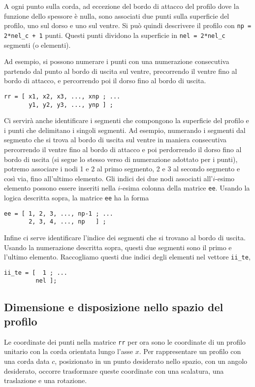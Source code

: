 \documentclass[11pt,fleqn]{article}
\begin{document}
A ogni punto sulla corda, ad eccezione del bordo di attacco del profilo dove la funzione dello spessore è nulla, sono associati due punti sulla superficie del profilo, uno sul dorso e uno sul ventre. Si può quindi descrivere il profilo con \texttt{np = 2*nel\_c + 1} punti. Questi punti dividono la superficie in \texttt{nel = 2*nel\_c} segmenti (o elementi).

Ad esempio, si possono numerare i punti con una numerazione consecutiva partendo dal punto al bordo di uscita sul ventre, precorrendo il ventre fino al bordo di attacco, e percorrendo poi il dorso fino al bordo di uscita.
\begin{verbatim}
rr = [ x1, x2, x3, ..., xnp ; ...
       y1, y2, y3, ..., ynp ] ;
\end{verbatim}

Ci servirà anche identificare i segmenti che compongono la superficie del profilo e i punti che delimitano i singoli segmenti. Ad esempio, numerando i segmenti dal segmento che si trova al bordo di uscita sul ventre in maniera consecutiva percorrendo il ventre fino al bordo di attacco e poi perdorrendo il dorso fino al bordo di uscita (si segue lo stesso verso di numerazione adottato per i punti), potremo associare i nodi 1 e 2 al primo segmento, 2 e 3 al secondo segmento e così via, fino all'ultimo elemento. Gli indici dei due nodi associati all'$i$-esimo elemento possono essere inseriti nella $i$-esima colonna della matrice \texttt{ee}. Usando la logica descritta sopra, la matrice \texttt{ee} ha la forma
\begin{verbatim}
ee = [ 1, 2, 3, ..., np-1 ; ...
       2, 3, 4, ..., np   ] ;
\end{verbatim}

Infine ci serve identificare l'indice dei segmenti che si trovano al bordo di uscita. Usando la numerazione descritta sopra, questi due segmenti sono il primo e l'ultimo elemento. Raccogliamo questi due indici degli elementi nel vettore \texttt{ii\_te},
\begin{verbatim}
ii_te = [  1 ; ...
         nel ];
\end{verbatim}

\subsection{Dimensione e disposizione nello spazio del profilo}
Le coordinate dei punti nella matrice \texttt{rr} per ora sono le coordinate di un profilo unitario con la corda orientata lungo l'asse $x$. Per rappresentare un profilo con una corda data $c$, posizionato in un punto desiderato nello spazio, con un angolo desiderato, occorre trasformare queste coordinate con una scalatura, una traslazione e una rotazione.
\end{document}
